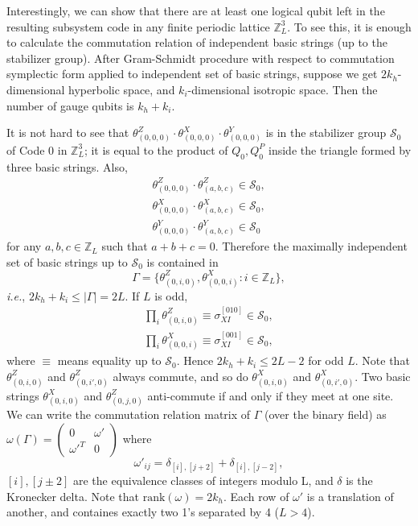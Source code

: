 \documentclass[letterpaper,10pt,pra,aps,showpacs,twocolumn]{revtex4-1}
\theoremstyle{definition} \newtheorem{defn}{Definition}
\theoremstyle{definition} \newtheorem{remark}{Remark}
\newcommand{\rank}{\mathrm{rank}}
\newcommand{\ie}{\emph{i.e.}}
\begin{document}
Interestingly, we can show that there are at least one logical qubit left in the resulting subsystem code in any finite periodic lattice $\mathbb{Z}_L^3$. To see this, it is enough to calculate the commutation relation of independent basic strings (up to the stabilizer group). After Gram-Schmidt procedure with respect to commutation symplectic form applied to independent set of basic strings, suppose we get $2 k_h$-dimensional hyperbolic space, and $k_i$-dimensional isotropic space. Then the number of gauge qubits is $k_h + k_i$.

It is not hard to see that $\theta^Z_{(0,0,0)} \cdot \theta^X_{(0,0,0)} \cdot \theta^Y_{(0,0,0)}$ is in the stabilizer group $\mathcal{S}_0$ of Code 0 in $\mathbb{Z}_L^3$; it is equal to the product of $Q_0, Q_0^P$ inside the triangle formed by three basic strings. Also, 
\begin{align*}
\theta^Z_{(0,0,0)} \cdot \theta^Z_{(a,b,c)} \in \mathcal{S}_0 , \\
\theta^X_{(0,0,0)} \cdot \theta^X_{(a,b,c)} \in \mathcal{S}_0 , \\
\theta^Y_{(0,0,0)} \cdot \theta^Y_{(a,b,c)} \in \mathcal{S}_0 
\end{align*}
for any $a,b,c \in \mathbb{Z}_L$ such that $ a+b+c = 0$. Therefore the maximally independent set of basic strings up to $\mathcal{S}_0$ is contained in
\[
 \Gamma = \{ \theta^Z_{(0,i,0)}, \theta^X_{(0,0,i)} : i \in \mathbb{Z}_L \},
\]
\ie, $2 k_h + k_i \leq |\Gamma| = 2 L$. If $L$ is odd,
\begin{align*}
 \prod_i \theta^Z_{(0,i,0)} \equiv \sigma_{XI}^{[010]} \in \mathcal{S}_0 ,\\
 \prod_i \theta^X_{(0,0,i)} \equiv \sigma_{XI}^{[001]} \in \mathcal{S}_0 ,
\end{align*}
where $\equiv$ means equality up to $\mathcal{S}_0$. Hence $2 k_h + k_i \leq 2L -2$ for odd $L$.
Note that $\theta^Z_{(0,i,0)}$ and $\theta^Z_{(0,i',0)}$ always commute, and so do $\theta^X_{(0,i,0)}$ and $\theta^X_{(0,i',0)}$. Two basic strings $\theta^X_{(0,i,0)}$ and $\theta^Z_{(0,j,0)}$ anti-commute if and only if they meet at one site. We can write the commutation relation matrix of $\Gamma$ (over the binary field) as $\omega(\Gamma) = \begin{pmatrix} 0 & \omega' \\ \omega'^T & 0 \end{pmatrix}$ where
\[
 \omega'_{ij} = \delta_{[i],[j+2]} + \delta_{[i],[j-2]},
\]
$[i],[j \pm 2]$ are the equivalence classes of integers modulo L, and $\delta$ is the Kronecker delta. Note that $\rank(\omega) = 2 k_h$.
Each row of $\omega'$ is a translation of another, and containes exactly two 1's separated by 4 ($L > 4$).
\end{document}
